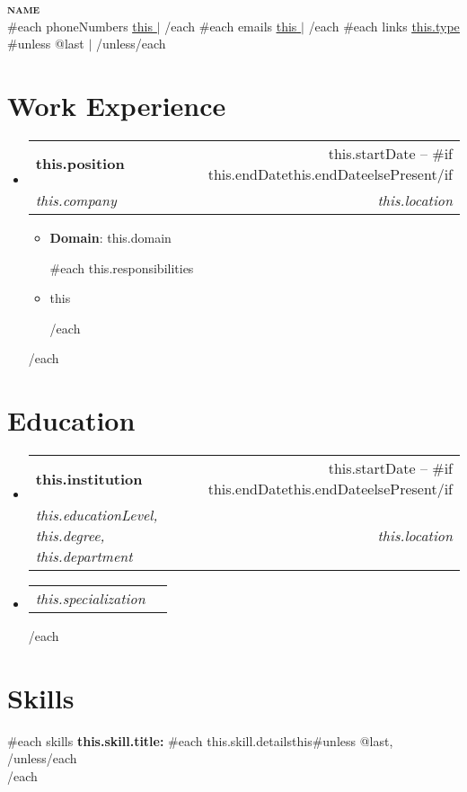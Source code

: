 \documentclass[letterpaper,11pt]{article}
\makeatletter
\newcommand{\resumeItem}[1]{
  \item\small{
    {#1 \vspace{-2pt}}
  }
}
\newcommand{\resumeSubheading}[4]{
  \vspace{-2pt}\item
    \begin{tabular*}{0.97\textwidth}[t]{l@{\extracolsep{\fill}}r}
      \textbf{#1} & #2 \\
      \textit{\small#3} & \textit{\small #4} \\
    \end{tabular*}\vspace{-7pt}
}
\newcommand{\resumeSubSubheading}[2]{
    \item
    \begin{tabular*}{0.97\textwidth}{l@{\extracolsep{\fill}}r}
      \textit{\small#1} & \textit{\small #2} \\
    \end{tabular*}\vspace{-7pt}
}
\newcommand{\resumeSubHeadingListStart}{\begin{itemize}[leftmargin=0.15in, label={}]}
\newcommand{\resumeSubHeadingListEnd}{\end{itemize}}
\newcommand{\resumeItemListStart}{\begin{itemize}}
\newcommand{\resumeItemListEnd}{\end{itemize}\vspace{-5pt}}
\makeatother
\begin{document}
\begin{center}
    \textbf{\Huge\scshape {{name}} } \\ \vspace{1pt}
    {{#each phoneNumbers}} \small{\href{tel:{{this}} }{\underline{ {{this}} }}} $|$ {{/each}}
    {{#each emails}} \small{\href{mailto:{{this}} }{\underline{ {{this}} }}} $|$ {{/each}}
    {{#each links}} \small{\href{ {{this.url}} }{\underline{ {{this.type}} }}}{{#unless @last}} $|$ {{/unless}}{{/each}}
\end{center}

\section{Work Experience}
  \resumeSubHeadingListStart
  {{#each workExperiences}}
    \resumeSubheading
    { {{this.position}} }{ {{this.startDate}} -- {{#if this.endDate}}{{this.endDate}}{{else}}Present{{/if}} }
        { {{this.company}} }{ {{this.location}} }
        \resumeItemListStart
          \resumeItem{\textbf{Domain}: {{this.domain}} }
          {{#each this.responsibilities}}
          \resumeItem{ {{this}} }
          {{/each}}
        \resumeItemListEnd
  {{/each}}
  \resumeSubHeadingListEnd

\section{Education}
  \resumeSubHeadingListStart
  {{#each educations}}
    \resumeSubheading
    { {{this.institution}} } { {{this.startDate}} -- {{#if this.endDate}}{{this.endDate}}{{else}}Present{{/if}} }
        { {{this.educationLevel}}, {{this.degree}}, {{this.department}} }{ {{this.location}} }
        \resumeSubSubheading
          { {{this.specialization}} }
          {}
  {{/each}}
  \resumeSubHeadingListEnd

\section{Skills}
 \begin{itemize}[leftmargin=0.15in, label={}]
    \small{\item{
      {{#each skills}}
        \textbf{ {{this.skill.title}}: }{ {{#each this.skill.details}}{{this}}{{#unless @last}}, {{/unless}}{{/each}} } \\
      {{/each}}
    }}
 \end{itemize}
\end{document}
